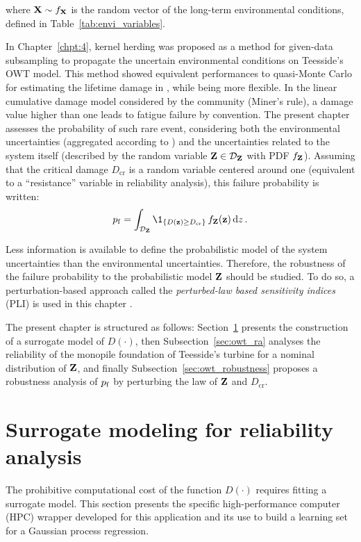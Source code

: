 where ${\bf X} \sim f_{\bf X}$ is the random vector of the long-term environmental conditions, defined in Table~\ref{tab:envi_variables}. 

In Chapter~\ref{chpt:4}, kernel herding was proposed as a method for given-data subsampling to propagate the uncertain environmental conditions on Teesside's OWT model. 
This method showed equivalent performances to quasi-Monte Carlo for estimating the lifetime damage in , while being more flexible. 
In the linear cumulative damage model considered by the community (Miner's rule), a damage value higher than one leads to fatigue failure by convention. 
The present chapter assesses the probability of such rare event, considering both the environmental uncertainties (aggregated according to ) and the uncertainties related to the system itself (described by the random variable ${\bf Z} \in \mathcal{D}_{\bf Z}$ with PDF $f_{\bf Z}$). 
Assuming that the critical damage $D_{\mathrm{cr}}$ is a random variable centered around one (equivalent to a ``resistance'' variable in reliability analysis), this failure probability is written:
\begin{equation}
    \pf = \int_{\iD_\bZ} \1_{\{D(\bz) \geq D_{\mathrm{cr}}\}} \, f_\bZ(\bz) \, \dd z \,.
    \label{eq:owt_pf}
\end{equation}

Less information is available to define the probabilistic model of the system uncertainties than the environmental uncertainties. 
Therefore, the robustness of the failure probability to the probabilistic model ${\bf Z}$ should be studied. 
To do so, a perturbation-based approach called the \textit{perturbed-law based sensitivity indices} (PLI) is used in this chapter \citep{lemaitre_2015_PLI}.   

The present chapter is structured as follows: 
Section~\ref{sec:owt_surrogate} presents the construction of a surrogate model of $D(\cdot)$,
then Subsection~\ref{sec:owt_ra} analyses the reliability of the monopile foundation of Teesside's turbine for a nominal distribution of ${\bf Z}$, 
and finally Subsection~\ref{sec:owt_robustness} proposes a robustness analysis of $p_\mathrm{f}$ by perturbing the law of ${\bf Z}$ and $D_{\mathrm{cr}}$.

\section{Surrogate modeling for reliability analysis}\label{sec:owt_surrogate}
The prohibitive computational cost of the function $D(\cdot)$ requires fitting a surrogate model.  
This section presents the specific high-performance computer (HPC) wrapper developed for this application and its use to build a learning set for a Gaussian process regression. 

